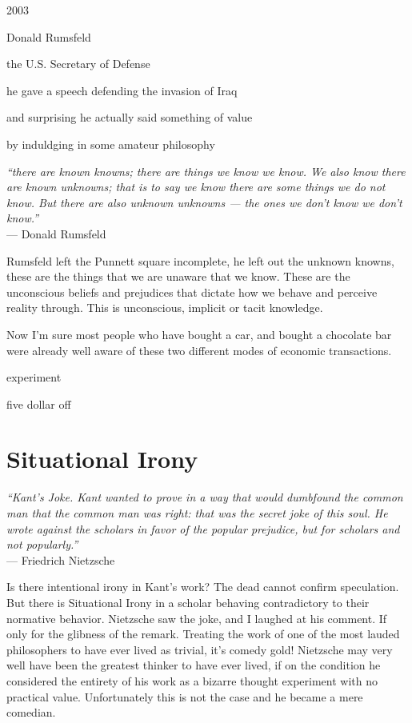 2003

Donald Rumsfeld 

the U.S. Secretary of Defense 

he gave a speech defending the invasion of Iraq 

and surprising he actually said something of value

by induldging in some amateur philosophy

\begin{center}
\textit{``there are known knowns; there are things we know we know. We also know there are known unknowns; that is to say we know there are some things we do not know. But there are also unknown unknowns --- the ones we don't know we don't know.''}\\ --- Donald Rumsfeld
\end{center}

Rumsfeld left the Punnett square incomplete, he left out the unknown knowns, these are the things that we are unaware that we know. These are the unconscious beliefs and prejudices that dictate how we behave and perceive reality through. This is unconscious, implicit or tacit knowledge.

Now I'm sure most people who have bought a car, and bought a chocolate bar were already well aware of these two different modes of economic transactions.

experiment 

five dollar off



\newpage
\section{Situational Irony}

\begin{center}
\textit{``Kant’s Joke. Kant wanted to prove in a way that would dumbfound the common man that the common man was right: that was the secret joke of this soul. He wrote against the scholars in favor of the popular prejudice, but for scholars and not popularly.''}
\\ --- Friedrich Nietzsche
\end{center}

Is there intentional irony in Kant's work? The dead cannot confirm speculation. But there is Situational Irony in a scholar behaving contradictory to their normative behavior. Nietzsche saw the joke, and I laughed at his comment. If only for the glibness of the remark. Treating the work of one of the most lauded philosophers to have ever lived as trivial, it's comedy gold! Nietzsche may very well have been the greatest thinker to have ever lived, if on the condition he considered the entirety of his work as a bizarre thought experiment with no practical value. 
Unfortunately this is not the case and he became a mere comedian. 

